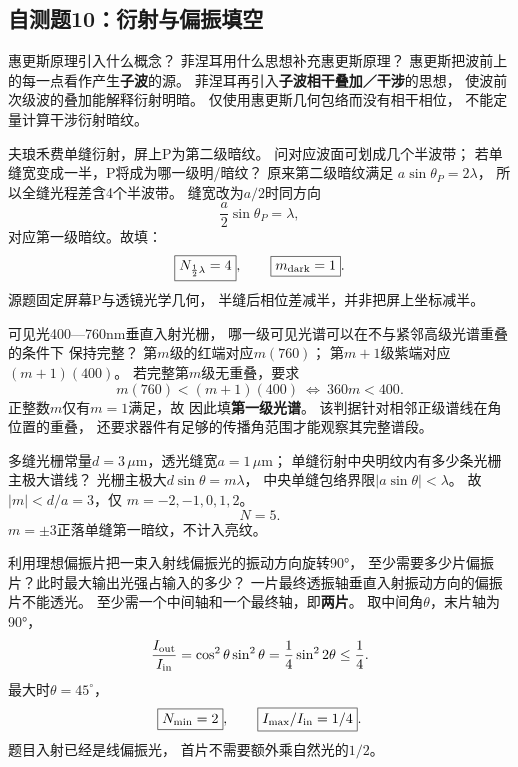 \subsection{自测题10：衍射与偏振填空}

\problemtext 惠更斯原理引入什么概念？
菲涅耳用什么思想补充惠更斯原理？
\workings
惠更斯把波前上的每一点看作产生\textbf{子波}的源。
菲涅耳再引入\textbf{子波相干叠加／干涉}的思想，
使波前次级波的叠加能解释衍射明暗。
\crosscheck 仅使用惠更斯几何包络而没有相干相位，
不能定量计算干涉衍射暗纹。

\problemtext 夫琅禾费单缝衍射，屏上P为第二级暗纹。
问对应波面可划成几个半波带；
若单缝宽变成一半，P将成为哪一级明/暗纹？
\workings
原来第二级暗纹满足
$a\sin\theta_P=2\lambda$，
所以全缝光程差含4个半波带。
缝宽改为$a/2$时同方向
\[
\frac a2\sin\theta_P=\lambda,
\]
对应第一级暗纹。故填：
\[
\boxed{N_{\frac12\lambda}=4},\qquad
\boxed{m_{\rm dark}=1}.
\]
\crosscheck 源题固定屏幕P与透镜光学几何，
半缝后相位差减半，并非把屏上坐标减半。

\problemtext 可见光400—760nm垂直入射光栅，
哪一级可见光谱可以在不与紧邻高级光谱重叠的条件下
保持完整？
\workings
第$m$级的红端对应$m(760)$；
第$m+1$级紫端对应$(m+1)(400)$。
若完整第$m$级无重叠，要求
\[
m(760)<(m+1)(400)
\ \Longleftrightarrow\ 360m<400.
\]
正整数$m$仅有$m=1$满足，故
因此填\textbf{第一级光谱}。
\crosscheck 该判据针对相邻正级谱线在角位置的重叠，
还要求器件有足够的传播角范围才能观察其完整谱段。

\problemtext 多缝光栅常量$d=3\,\mu$m，透光缝宽$a=1\,\mu$m；
单缝衍射中央明纹内有多少条光栅主极大谱线？
\workings
光栅主极大$d\sin\theta=m\lambda$，
中央单缝包络界限$|a\sin\theta|<\lambda$。
故$|m|<d/a=3$，仅
$m=-2,-1,0,1,2$。
\[
\boxed{N=5}.
\]
\crosscheck $m=\pm3$正落单缝第一暗纹，不计入亮纹。

\problemtext 利用理想偏振片把一束入射线偏振光的振动方向旋转90°，
至少需要多少片偏振片？此时最大输出光强占输入的多少？
\workings
一片最终透振轴垂直入射振动方向的偏振片不能透光。
至少需一个中间轴和一个最终轴，即\textbf{两片}。
取中间角$\theta$，末片轴为90°，
\[
\frac{I_{\rm out}}{I_{\rm in}}=
\cos^2\theta\sin^2\theta
=\frac14\sin^22\theta\le\frac14.
\]
最大时$\theta=45^\circ$，
\[
\boxed{N_{\min}=2},\qquad\boxed{I_{\max}/I_{\rm in}=1/4}.
\]
\crosscheck 题目入射已经是线偏振光，
首片不需要额外乘自然光的$1/2$。

